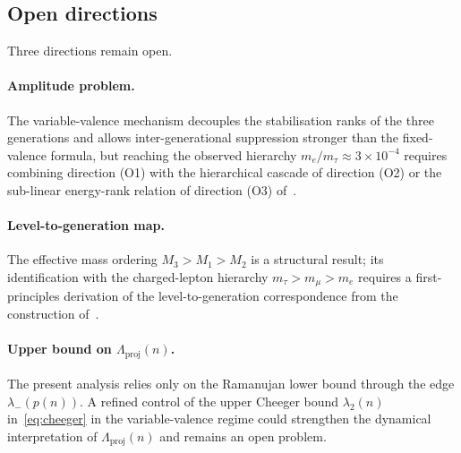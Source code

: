 \documentclass[11pt]{article}
\newcommand{\Lproj}{\Lambda_{\mathrm{proj}}}
\begin{document}
  \subsection{Open directions}
    \label{subsec:open}

    Three directions remain open.

    \paragraph{Amplitude problem.}
      The variable-valence mechanism decouples the stabilisation ranks of the three
      generations and allows inter-generational suppression stronger than the
      fixed-valence formula, but reaching the observed hierarchy
      $m_e/m_\tau \approx 3 \times 10^{-4}$ requires combining direction (O1) with
      the hierarchical cascade of direction (O2) or the sub-linear energy-rank
      relation of direction (O3) of~\cite{Beau2026a5}.

    \paragraph{Level-to-generation map.}
      The effective mass ordering $M_3 > M_1 > M_2$ is a structural result;
      its identification with the charged-lepton hierarchy $m_\tau > m_\mu > m_e$
      requires a first-principles derivation of the level-to-generation
      correspondence from the construction of~\cite{Beau2026a4}.

    \paragraph{Upper bound on $\Lproj(n)$.}
      The present analysis relies only on the Ramanujan lower bound through the
      edge $\lambda_-(p(n))$.
      A refined control of the upper Cheeger bound $\lambda_2(n)$
      in~\eqref{eq:cheeger} in the variable-valence regime could strengthen the
      dynamical interpretation of $\Lproj(n)$ and remains an open problem.

      \clearpage
      
      
\end{document}
